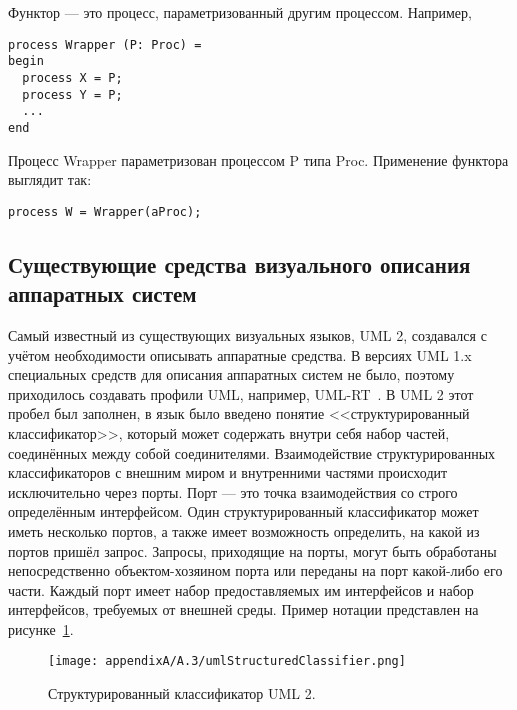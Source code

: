 Функтор --- это процесс, параметризованный другим процессом. Например,

\vspace{5mm}
\begin{minipage}{\linewidth}
\begin{verbatim}
process Wrapper (P: Proc) =
begin
  process X = P;
  process Y = P;
  ...
end
\end{verbatim}
\end{minipage}
\vspace{5mm}

Процесс Wrapper параметризован процессом P типа Proc. Применение функтора выглядит так:
\begin{verbatim}
process W = Wrapper(aProc);
\end{verbatim}

\subsection{Существующие средства визуального описания аппаратных систем}
Самый известный из существующих визуальных языков, UML 2, создавался с учётом необходимости 
описывать аппаратные средства. В версиях UML 1.x специальных средств для описания 
аппаратных систем не было, поэтому приходилось создавать профили UML, например, UML-RT~\cite{selic1998using}.
В UML 2 этот пробел был заполнен, в язык было введено понятие <<структурированный классификатор>>, 
который может содержать внутри себя набор частей, соединённых между собой соединителями. 
Взаимодействие структурированных классификаторов с внешним миром и внутренними частями 
происходит исключительно через порты. Порт --- это точка взаимодействия со строго 
определённым интерфейсом. Один структурированный классификатор может иметь несколько 
портов, а также имеет возможность определить, на какой из портов пришёл запрос. Запросы, 
приходящие на порты, могут быть обработаны непосредственно объектом-хозяином порта 
или переданы на порт какой-либо его части. Каждый порт имеет набор предоставляемых 
им интерфейсов и набор интерфейсов, требуемых от внешней среды. Пример нотации представлен 
на рисунке~\ref{image:umlStructuredClassifier}.

\begin{figure} [ht]
	\begin{center}
		\texttt{[image: appendixA/A.3/umlStructuredClassifier.png]}
		\caption{Структурированный классификатор UML 2.}
		\label{image:umlStructuredClassifier}
	\end{center}
\end{figure}


